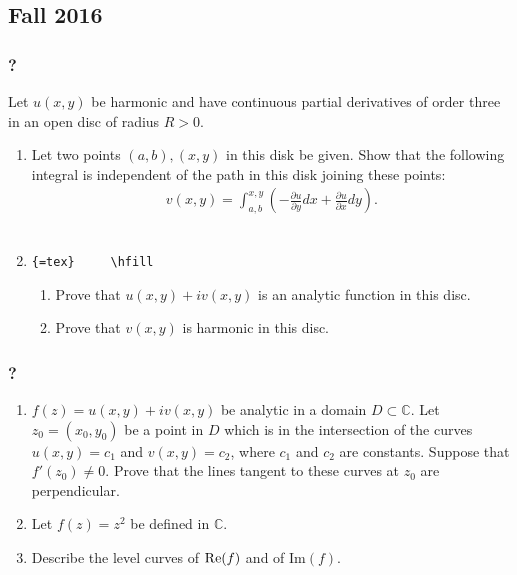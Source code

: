 \hypertarget{fall-2016}{%
\subsection{Fall 2016}\label{fall-2016}}

\hypertarget{section-191}{%
\subsubsection{?}\label{section-191}}

Let \(u(x,y)\) be harmonic and have continuous partial derivatives of
order three in an open disc of radius \(R>0\).

\begin{enumerate}
\def\labelenumi{(\alph{enumi})}
\item
  Let two points \((a,b), (x,y)\) in this disk be given. Show that the
  following integral is independent of the path in this disk joining
  these points:
  \begin{align*}v(x,y) = \int_{a,b}^{x,y} ( -\frac{\partial u}{\partial y}dx +  \frac{\partial u}{\partial x}dy).\end{align*}
  \\
\item
  \texttt{\{=tex\}\ \ \ \ \ \textbackslash{}hfill}

  \begin{enumerate}
  \def\labelenumii{(\roman{enumii})}
  \item
    Prove that \(u(x,y)+i v(x,y)\) is an analytic function in this disc.
  \item
    Prove that \(v(x,y)\) is harmonic in this disc.
  \end{enumerate}
\end{enumerate}

\hypertarget{section-192}{%
\subsubsection{?}\label{section-192}}

\begin{enumerate}
\def\labelenumi{(\alph{enumi})}
\item
  \(f(z)= u(x,y) +i v(x,y)\) be analytic in a domain
  \(D\subset {\mathbb C}\). Let \(z_0=(x_0,y_0)\) be a point in \(D\)
  which is in the intersection of the curves \(u(x,y)= c_1\) and
  \(v(x,y)=c_2\), where \(c_1\) and \(c_2\) are constants. Suppose that
  \(f'(z_0)\neq 0\). Prove that the lines tangent to these curves at
  \(z_0\) are perpendicular.
\item
  Let \(f(z)=z^2\) be defined in \({\mathbb C}\).
\item
  Describe the level curves of \(\mbox{\textrm Re}{(f)}\) and of
  \(\mbox{Im}{(f)}\).
\end{enumerate}

